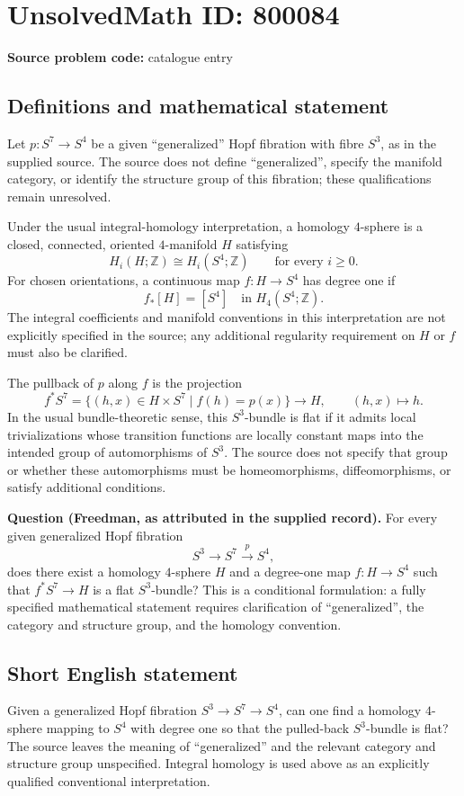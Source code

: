 \documentclass[11pt]{article}
\newcommand{\Z}{\mathbb{Z}}
\begin{document}
\section*{UnsolvedMath ID: 800084}
\textbf{Source problem code:} catalogue entry
\subsection{Definitions and mathematical statement}
Let \(p\colon S^7\to S^4\) be a given ``generalized'' Hopf fibration with fibre \(S^3\), as in the supplied source. The source does not define ``generalized'', specify the manifold category, or identify the structure group of this fibration; these qualifications remain unresolved.

Under the usual integral-homology interpretation, a homology \(4\)-sphere is a closed, connected, oriented \(4\)-manifold \(H\) satisfying
\[
H_i(H;\Z)\cong H_i(S^4;\Z)\qquad\text{for every }i\geq 0.
\]
For chosen orientations, a continuous map \(f\colon H\to S^4\) has degree one if
\[
f_*[H]=[S^4]\quad\text{in }H_4(S^4;\Z).
\]
The integral coefficients and manifold conventions in this interpretation are not explicitly specified in the source; any additional regularity requirement on \(H\) or \(f\) must also be clarified.

The pullback of \(p\) along \(f\) is the projection
\[
f^*S^7=\{(h,x)\in H\times S^7\mid f(h)=p(x)\}\longrightarrow H,
\qquad (h,x)\longmapsto h.
\]
In the usual bundle-theoretic sense, this \(S^3\)-bundle is flat if it admits local trivializations whose transition functions are locally constant maps into the intended group of automorphisms of \(S^3\). The source does not specify that group or whether these automorphisms must be homeomorphisms, diffeomorphisms, or satisfy additional conditions.

\textbf{Question (Freedman, as attributed in the supplied record).} For every given generalized Hopf fibration
\[
S^3\longrightarrow S^7\xrightarrow{\,p\,}S^4,
\]
does there exist a homology \(4\)-sphere \(H\) and a degree-one map \(f\colon H\to S^4\) such that \(f^*S^7\to H\) is a flat \(S^3\)-bundle? This is a conditional formulation: a fully specified mathematical statement requires clarification of ``generalized'', the category and structure group, and the homology convention.
\subsection{Short English statement}
Given a generalized Hopf fibration \(S^3\to S^7\to S^4\), can one find a homology \(4\)-sphere mapping to \(S^4\) with degree one so that the pulled-back \(S^3\)-bundle is flat? The source leaves the meaning of ``generalized'' and the relevant category and structure group unspecified. Integral homology is used above as an explicitly qualified conventional interpretation.
\end{document}
